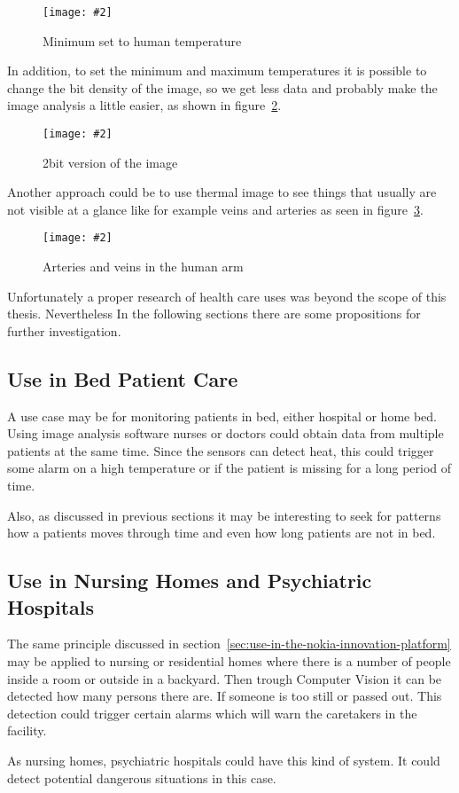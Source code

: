 \documentclass[hidelinks,11pt,a4paper,oneside,article]{memoir}
\newcommand{\putimage}[3][10] %
{
\begin{figure}[h]
	\centering
	\captionsetup{justification=centering}
	\texttt{[image: \#2]}
	\caption{#3}
	\label{fig:#2}
\end{figure}
}
\begin{document}
    \putimage{setminimum}{Minimum set to human temperature}

In addition, to set the minimum and maximum temperatures it is possible to change the bit density of the image, so we get less data and probably make the image analysis a little easier, as shown in figure~\ref{fig:2bit}.

    \putimage{2bit}{2bit version of the image}

Another approach could be to use thermal image to see things that usually are not visible at a glance like for example veins and arteries as seen in figure~\ref{fig:vein}.

	\putimage{vein}{Arteries and veins in the human arm}
	
Unfortunately a proper research of health care uses was beyond the scope of this thesis. Nevertheless In the following sections there are some propositions for further investigation.

\subsection{Use in Bed Patient Care}
A use case may be for monitoring patients in bed, either hospital or home bed. Using image analysis software nurses or doctors could obtain data from multiple patients at the same time. Since the sensors can detect heat, this could trigger some alarm on a high temperature or if the patient is missing for a long period of time.

Also, as discussed in previous sections it may be interesting to seek for patterns how a patients moves through time and even how long patients are not in bed.

    
\subsection{Use in Nursing Homes and Psychiatric Hospitals}

The same principle discussed in section~\ref{sec:use-in-the-nokia-innovation-platform} may be applied to nursing or residential homes where there is a number of people inside a room or outside in a backyard. Then trough Computer Vision it can be detected how many persons there are. If someone is too still or passed out. This detection could trigger certain alarms which will warn the caretakers in the facility.

As nursing homes, psychiatric hospitals could have this kind of system. It could detect potential dangerous situations in this case.
\end{document}

